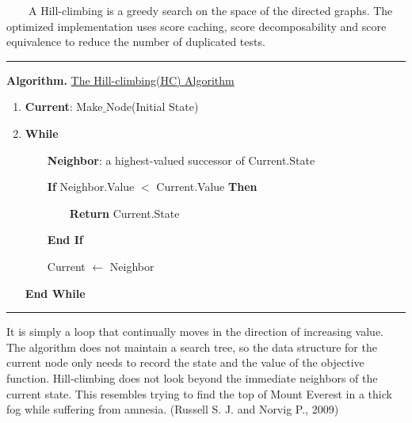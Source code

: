 ~~~~A Hill-climbing is a greedy search on the space of the directed graphs. The optimized implementation uses score caching, score decomposability and score equivalence to reduce the number of duplicated tests.

\begin{center}\rule[0.5ex]{0.9\columnwidth}{1pt}\end{center}

\textbf{Algorithm.} \underline{The Hill-climbing(HC) Algorithm}

\begin{enumerate}
	\item \textbf{Current}: Make$\_$Node(Initial State)
	
	\item \textbf{While}
	
	~~~~\textbf{Neighbor}: a highest-valued successor of Current.State
	
	~~~~\textbf{If} Neighbor.Value $<$ Current.Value \textbf{Then}
	
	~~~~~~~~\textbf{Return} Current.State
	
	~~~~\textbf{End If}
	
	~~~~Current $\leftarrow$ Neighbor
	
	\textbf{End While}
\end{enumerate}

\begin{center}\rule[0.5ex]{0.9\columnwidth}{1pt}\end{center}

It is simply a loop that continually moves in the direction of increasing value. The algorithm does not maintain a search tree, so the data structure for the current node only needs to record the state and the value of the objective function. Hill-climbing does not look beyond the immediate neighbors of the current state. This resembles trying to find the top of Mount Everest in a thick fog while suffering from amnesia. (Russell S. J. and Norvig P., 2009)